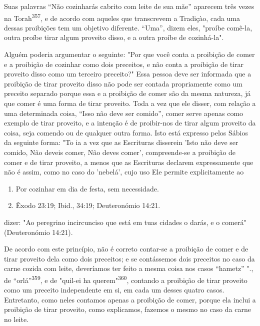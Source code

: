 Suas palavras ``Não cozinharás cabrito com leite de sua mãe'' apare­cem
três vezes na Torah\textsuperscript{357}, e de acordo com aqueles que
transcrevem a Tra­diçào, cada uma dessas proibições tem um objetivo
diferente. ``Uma'', dizem eles, "proíbe comê-la, outra proíbe tirar algum
proveito disso, e a outra proíbe de cozinhá-la".

Alguém poderia argumentar o seguinte: "Por que você conta a proi­bição
de comer e a proibição de cozinhar como dois preceitos, e não conta a
proibição de tirar proveito disso como um terceiro preceito?" Essa
pessoa deve ser informada que a proibição de tirar proveito disso não
pode ser con­tada propriamente como um preceito separado porque essa e a
proibição de comer são da mesma natureza, já que comer é uma forma de
tirar proveito. Toda a vez que ele disser, com relação a uma determinada
coisa, ``Isso não deve ser comido'', comer serve apenas como exemplo de
tirar proveito, e a intenção é de proibir-nos de tirar algum proveito da
coisa, seja comendo ou de qualquer outra forma. Isto está expresso pelos
Sábios da seguinte for­ma: "To ia a vez que as Escrituras disserein
'Isto não deve ser comido, Não deveis comer, Não deves comer',
compreende-se a proibição de comer e de tirar proveito, a menos que as
Escrituras declarem expressamente que não é assim, como no caso do
'nebelá', cujo uso Ele permite explicitamente ao


\begin{enumerate}
\def\labelenumi{\arabic{enumi}.}
\setcounter{enumi}{355}
\item
 
 Por cozinhar em dia de festa, sem necessidade.
 
\item
 
 Êxodo 23:19; Ibid., 34:19; Deuteronómio 14:21.
 
\end{enumerate}



dizer: "Ao peregrino incircunciso que está em tuas cidades o darás, e o
come­rá" (Deuteronómio 14:21).

De acordo com este princípio, não é correto contar-se a proibição de
comer e de tirar proveito dela como dois preceitos; e se contássemos
dois preceitos no caso da carne cozida com leite, deveríamos ter feito a
mesma coi­sa nos casos ``hametz'' "., de
``orlá''\textsuperscript{359}, e de "quil-ei ha
querem"\textsuperscript{360}, contan­do a proibição de tirar proveito
como um preceito independente em si, em ca­da um desses quatro casos.
Entretanto, como neles contamos apenas a proibi­ção de comer, porque ela
inclui a proibição de tirar proveito, como explica­mos, fazemos o mesmo
no caso da carne no leite.

